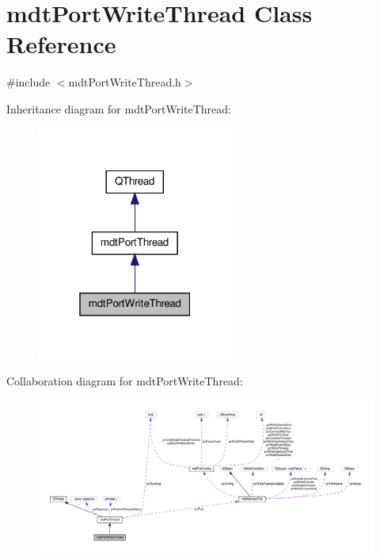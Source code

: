 \hypertarget{classmdt_port_write_thread}{\section{mdt\-Port\-Write\-Thread Class Reference}
\label{classmdt_port_write_thread}
}


{\ttfamily \#include $<$mdt\-Port\-Write\-Thread.\-h$>$}



Inheritance diagram for mdt\-Port\-Write\-Thread\-:\nopagebreak
\begin{figure}[H]
\begin{center}
\leavevmode
\includegraphics[width=184pt]{classmdt_port_write_thread__inherit__graph}
\end{center}
\end{figure}


Collaboration diagram for mdt\-Port\-Write\-Thread\-:\nopagebreak
\begin{figure}[H]
\begin{center}
\leavevmode
\includegraphics[width=350pt]{classmdt_port_write_thread__coll__graph}
\end{center}
\end{figure}
